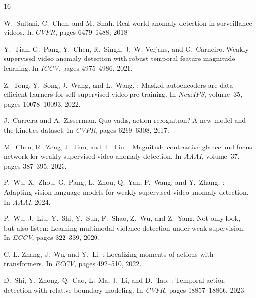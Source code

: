 \documentclass[sigconf,nonacm]{acmart}
\begin{document}
\begin{thebibliography}{16}

W.~Sultani, C.~Chen, and M.~Shah.
\newblock Real-world anomaly detection in surveillance videos.
\newblock In \emph{CVPR}, pages 6479--6488, 2018.

Y.~Tian, G.~Pang, Y.~Chen, R.~Singh, J.~W. Verjans, and G.~Carneiro.
\newblock Weakly-supervised video anomaly detection with robust temporal
  feature magnitude learning.
\newblock In \emph{ICCV}, pages 4975--4986, 2021.

Z.~Tong, Y.~Song, J.~Wang, and L.~Wang.
: Masked autoencoders are data-efficient learners for
  self-supervised video pre-training.
\newblock In \emph{NeurIPS}, volume~35, pages 10078--10093, 2022.

J.~Carreira and A.~Zisserman.
\newblock Quo vadis, action recognition? {A} new model and the kinetics
  dataset.
\newblock In \emph{CVPR}, pages 6299--6308, 2017.

M.~Chen, R.~Zeng, J.~Jiao, and T.~Liu.
: Magnitude-contrastive glance-and-focus network for
  weakly-supervised video anomaly detection.
\newblock In \emph{AAAI}, volume~37, pages 387--395, 2023.

P.~Wu, X.~Zhou, G.~Pang, L.~Zhou, Q.~Yan, P.~Wang, and Y.~Zhang.
: Adapting vision-language models for weakly supervised
  video anomaly detection.
\newblock In \emph{AAAI}, 2024.

P.~Wu, J.~Liu, Y.~Shi, Y.~Sun, F.~Shao, Z.~Wu, and Z.~Yang.
\newblock Not only look, but also listen: Learning multimodal violence
  detection under weak supervision.
\newblock In \emph{ECCV}, pages 322--339, 2020.

C.-L. Zhang, J.~Wu, and Y.~Li.
: Localizing moments of actions with transformers.
\newblock In \emph{ECCV}, pages 492--510, 2022.

D.~Shi, Y.~Zhong, Q.~Cao, L.~Ma, J.~Li, and D.~Tao.
: Temporal action detection with relative boundary modeling.
\newblock In \emph{CVPR}, pages 18857--18866, 2023.


\end{thebibliography}
\end{document}
